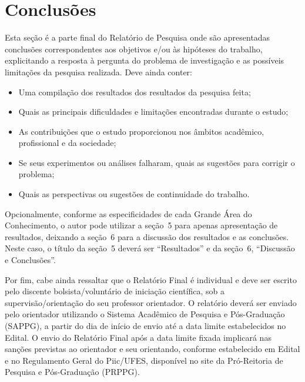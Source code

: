 \documentclass[10pt,a4paper]{article}
\begin{document}
\section{Conclusões}
Esta seção é a parte final do Relatório de Pesquisa onde são apresentadas conclusões correspondentes aos objetivos e/ou às hipóteses do trabalho, explicitando a resposta à pergunta do problema de investigação e as possíveis limitações da pesquisa realizada. Deve ainda conter:
\begin{itemize}
  \item Uma compilação dos resultados dos resultados da pesquisa feita;
  \item Quais as principais dificuldades e limitações encontradas durante o estudo;
  \item As contribuições que o estudo proporcionou nos âmbitos acadêmico, profissional e da sociedade;
  \item Se seus experimentos ou análises falharam, quais as sugestões para corrigir o problema;
  \item Quais as perspectivas ou sugestões de continuidade do trabalho.
\end{itemize}

\vspace{\baselineskip}
Opcionalmente, conforme as especificidades de cada Grande Área do Conhecimento, o autor pode utilizar a seção~5 para apenas apresentação de resultados, deixando a seção~6 para a discussão dos resultados e as conclusões. Neste caso, o título da seção~5 deverá ser ``Resultados'' e da seção~6, ``Discussão e Conclusões''.

\vspace{\baselineskip}
Por fim, cabe ainda ressaltar que o Relatório Final é individual e deve ser escrito pelo discente bolsista/voluntário de iniciação científica, sob a supervisão/orientação do seu professor orientador. O relatório deverá ser enviado pelo orientador utilizando o Sistema Acadêmico de Pesquisa e Pós-Graduação (SAPPG), a partir do dia de início de envio até a data limite estabelecidos no Edital. O envio do Relatório Final após a data limite fixada implicará nas sanções previstas ao orientador e seu orientando, conforme estabelecido em Edital e no Regulamento Geral do Piic/UFES, disponível no site da Pró-Reitoria de Pesquisa e Pós-Graduação (PRPPG).

\end{document}
